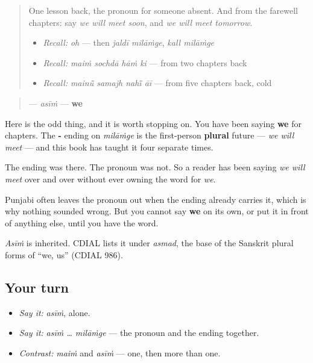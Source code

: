 \begin{quote}
One lesson back, the pronoun for someone absent. And from the farewell chapters: say \emph{we will meet soon}, and \emph{we will meet tomorrow}.

\begin{itemize}
\raggedright
  \item \emph{Recall:} \emph{oh} — then \emph{jaldī milāṁge}, \emph{kall milāṁge}
  \item \emph{Recall:} \emph{maiṁ sochdā hāṁ ki} — from two chapters back
  \item \emph{Recall:} \emph{mainū̃ samajh nahī̃ āī} — from five chapters back, cold
\end{itemize}
\end{quote}

\begin{cousinweb}
\begin{quote}
\textbf{} — \emph{asīṁ} — \textbf{we}
\end{quote}

Here is the odd thing, and it is worth stopping on. You have been saying \textbf{we} for chapters. The \textbf{-} ending on \emph{milāṁge} is the first-person \textbf{plural} future — \emph{we will meet} — and this book has taught it four separate times.

The ending was there. The pronoun was not. So a reader has been saying \emph{we will meet} over and over without ever owning the word for \emph{we}.

Punjabi often leaves the pronoun out when the ending already carries it, which is why nothing sounded wrong. But you cannot say \textbf{we} on its own, or put it in front of anything else, until you have the word.

\emph{Asīṁ} is inherited. CDIAL lists it under \emph{asmad}, the base of the Sanskrit plural forms of \textquotedblleft{}we, us\textquotedblright{} (CDIAL 986).
\end{cousinweb}

\subsection*{Your turn}
\begin{itemize}
\raggedright
  \item \emph{Say it:} \emph{asīṁ}, alone.
  \item \emph{Say it:} \emph{asīṁ … milāṁge} — the pronoun and the ending together.
  \item \emph{Contrast:} \emph{maiṁ} and \emph{asīṁ} — one, then more than one.
\end{itemize}

